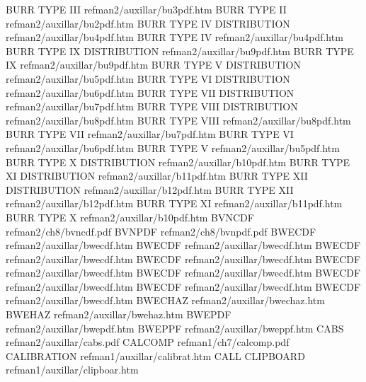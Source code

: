 BURR TYPE III                           refman2/auxillar/bu3pdf.htm
BURR TYPE II                            refman2/auxillar/bu2pdf.htm
BURR TYPE IV DISTRIBUTION               refman2/auxillar/bu4pdf.htm
BURR TYPE IV                            refman2/auxillar/bu4pdf.htm
BURR TYPE IX DISTRIBUTION               refman2/auxillar/bu9pdf.htm
BURR TYPE IX                            refman2/auxillar/bu9pdf.htm
BURR TYPE V DISTRIBUTION                refman2/auxillar/bu5pdf.htm
BURR TYPE VI DISTRIBUTION               refman2/auxillar/bu6pdf.htm
BURR TYPE VII DISTRIBUTION              refman2/auxillar/bu7pdf.htm
BURR TYPE VIII DISTRIBUTION             refman2/auxillar/bu8pdf.htm
BURR TYPE VIII                          refman2/auxillar/bu8pdf.htm
BURR TYPE VII                           refman2/auxillar/bu7pdf.htm
BURR TYPE VI                            refman2/auxillar/bu6pdf.htm
BURR TYPE V                             refman2/auxillar/bu5pdf.htm
BURR TYPE X DISTRIBUTION                refman2/auxillar/b10pdf.htm
BURR TYPE XI DISTRIBUTION               refman2/auxillar/b11pdf.htm
BURR TYPE XII DISTRIBUTION              refman2/auxillar/b12pdf.htm
BURR TYPE XII                           refman2/auxillar/b12pdf.htm
BURR TYPE XI                            refman2/auxillar/b11pdf.htm
BURR TYPE X                             refman2/auxillar/b10pdf.htm
BVNCDF                                  refman2/ch8/bvncdf.pdf
BVNPDF                                  refman2/ch8/bvnpdf.pdf
BWECDF                                  refman2/auxillar/bwecdf.htm
BWECDF                                  refman2/auxillar/bwecdf.htm
BWECDF                                  refman2/auxillar/bwecdf.htm
BWECDF                                  refman2/auxillar/bwecdf.htm
BWECDF                                  refman2/auxillar/bwecdf.htm
BWECDF                                  refman2/auxillar/bwecdf.htm
BWECDF                                  refman2/auxillar/bwecdf.htm
BWECDF                                  refman2/auxillar/bwecdf.htm
BWECDF                                  refman2/auxillar/bwecdf.htm
BWECHAZ                                 refman2/auxillar/bwechaz.htm
BWEHAZ                                  refman2/auxillar/bwehaz.htm
BWEPDF                                  refman2/auxillar/bwepdf.htm
BWEPPF                                  refman2/auxillar/bweppf.htm
CABS                                    refman2/auxillar/cabs.pdf
CALCOMP                                 refman1/ch7/calcomp.pdf
CALIBRATION                             refman1/auxillar/calibrat.htm
CALL CLIPBOARD                          refman1/auxillar/clipboar.htm
